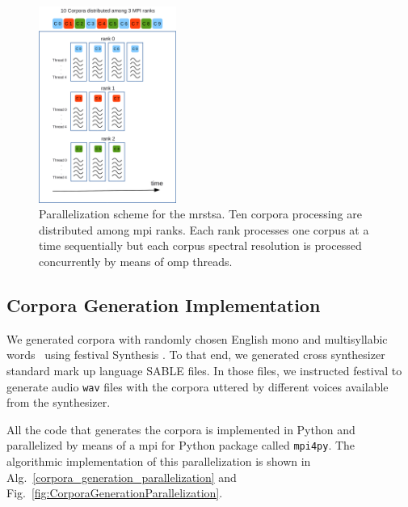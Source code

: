 \documentclass[10pt,journal,compsoc]{IEEEtran}
\begin{document}
\begin{figure}[h!]
    \centering
    \includegraphics[width=0.4\textwidth]{MRSTSA_Parallelization.png}
    \caption{Parallelization scheme for the \gls{mrstsa}. Ten corpora processing are distributed among \gls{mpi} ranks. Each rank processes one corpus at a time sequentially but each corpus spectral resolution is processed concurrently by means of \gls{omp} threads.}
    \label{fig:MRSTSA_Parallelization}
\end{figure}















\subsection{Corpora Generation Implementation}
\label{CorpGenImp}

We generated corpora with randomly chosen English mono and multisyllabic words~\cite{Dematties2018} using \gls{festival} Synthesis \cite{festival2014}. To that end, we generated cross synthesizer standard mark up language SABLE \cite{sable} files. In those files, we instructed \gls{festival} to generate audio \texttt{wav} files with the corpora uttered by different voices available from the synthesizer.

All the code that generates the corpora is implemented in Python and parallelized by means of a \gls{mpi} for Python package called \texttt{mpi4py}. The algorithmic implementation of this parallelization is shown in Alg.~\ref{corpora_generation_parallelization} and Fig.~\ref{fig:CorporaGenerationParallelization}.
\end{document}

